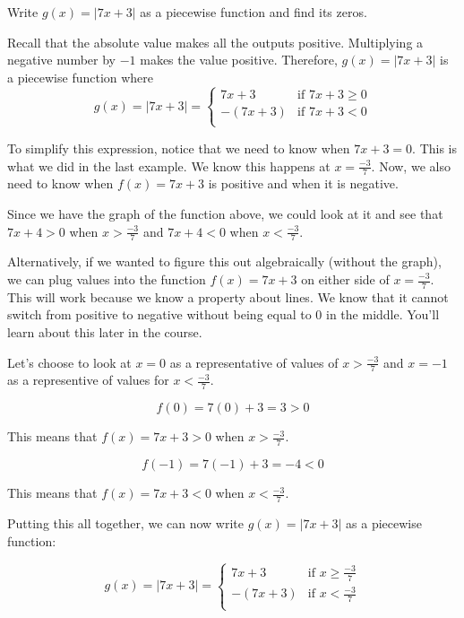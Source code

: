 \documentclass[nooutcomes]{ximera}
\begin{document}
\begin{example}
Write $g(x)=|7x+3|$ as a piecewise function and find its zeros.
\begin{explanation}
Recall that the absolute value makes all the outputs positive.  Multiplying a negative number by $-1$ makes the value positive.  Therefore, $g(x)=|7x+3|$ is a piecewise function where
$$
  g(x) =|7x+3|=
  \begin{cases}
                                   7x+3 & \text{if $7x+3 \geq 0$} \\
                                   -(7x+3) & \text{if $7x+3 <0$} \\
  \end{cases}
$$

To simplify this expression, notice that we need to know when $7x+3=0$. This is what we did in the last example.  We know this happens at $x=\tfrac{-3}{7}$.  Now, we also need to know when $f(x)=7x+3$ is positive and when it is negative.  

Since we have the graph of the function above, we could look at it and see that $7x+4>0$ when $x>\tfrac{-3}{7}$ and $7x+4<0$ when $x<\tfrac{-3}{7}$.

Alternatively, if we wanted to figure this out algebraically (without the graph), we can plug values into the function  $f(x)=7x+3$ on either side of  $x=\tfrac{-3}{7}$.  This will work because we know a property about lines.  We know that it cannot switch from positive to negative without being equal to 0 in the middle. You'll learn about this later in the course.

Let's choose to look at $x=0$ as a representative of values of $x>\tfrac{-3}{7}$ and $x=-1$ as a representive of values for $x<\tfrac{-3}{7}$.

$$
f(0)=7(0)+3=3>0
$$

This means that $f(x)=7x+3 >0$ when $x>\tfrac{-3}{7}$.

$$
f(-1)=7(-1)+3=-4<0 
$$

This means that $f(x)=7x+3 <0$ when $x<\tfrac{-3}{7}$.

Putting this all together, we can now write  $g(x)=|7x+3|$ as a piecewise function:

$$
  g(x) =|7x+3|=
  \begin{cases}
                                   7x+3 & \text{if $x \geq \tfrac{-3}{7}$} \\
                                   -(7x+3) & \text{if $x < \tfrac{-3}{7}$} \\
  \end{cases}
$$


\end{explanation}
\end{example}
\end{document}
